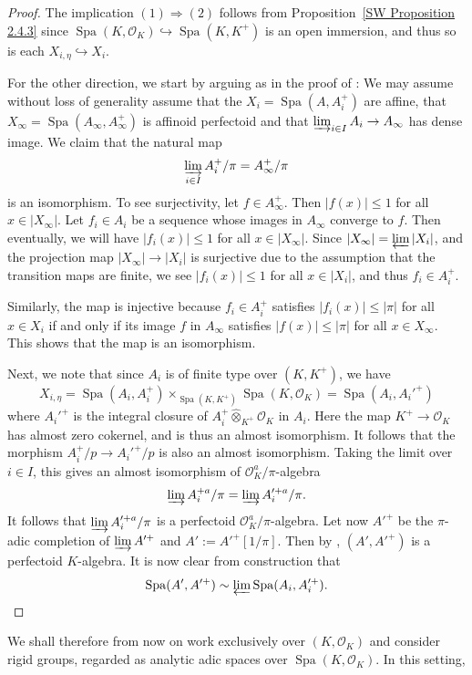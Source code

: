 \documentclass[10pt,oneside]{amsart}
\theoremstyle{definition}
\newcommand{\Spa}{\operatorname{Spa}}
\newcommand{\hotimes}{\hat{\otimes}}
\begin{document}
\begin{proof}
	The implication $(1)\Rightarrow (2)$ follows from Proposition~\ref{SW Proposition 2.4.3} since $\Spa(K,\mathcal O_K)\hookrightarrow \Spa(K,K^+)$ is an open immersion, and thus so is each $X_{i,\eta}\hookrightarrow X_i$.
	
	For the other direction, we start by arguing as in the proof of \cite[Prop. 2.4.5]{SW}: We may assume without loss of generality assume that the $X_i=\Spa(A,A_i^+)$ are affine, that $X_\infty=\Spa(A_\infty,A_\infty^+)$ is affinoid perfectoid and that $\varinjlim_{i\in I} A_i\to A_\infty$ has dense image. We claim that the natural map
	\[\varinjlim_{i\in I}A_i^+/\pi= A_\infty^{+}/\pi\]
	is an isomorphism. To see surjectivity, let $f\in A_\infty^+$. Then $|f(x)|\leq 1$ for all $x\in |X_\infty|$. Let $f_i\in A_i$ be a sequence whose images in $A_\infty$ converge to $f$. Then eventually, we will have $|f_i(x)|\leq 1$ for all  $x\in |X_\infty|$. Since $|X_\infty|=\varprojlim |X_i|$, and the projection map $|X_\infty|\to |X_i|$ is surjective due to the assumption that the transition maps are finite, we see $|f_i(x)|\leq 1$ for all $x\in |X_i|$, and thus $f_i\in A_i^+$.
	
	Similarly, the map is injective because $f_i\in A_i^+$ satisfies $|f_i(x)|\leq |\pi|$ for all $x\in X_i$ if and only if its image $f$ in $A_\infty$ satisfies $|f(x)|\leq |\pi|$ for all $x\in X_\infty$. This shows that the map is an isomorphism.
	
	
	Next, we note that since $A_i$ is of finite type over $(K,K^+)$, we have \[X_{i,\eta}=\Spa(A_i,A_i^+)\times_{\Spa(K,K^+)}\Spa(K,\mathcal O_K)=\Spa(A_i,A_i'^+)\]
	where $A_i'^+$ is the integral closure of $A_i^+\hotimes_{K^+}\mathcal O_K$ in $A_i$. Here the map $K^+\to \mathcal O_K$ has almost zero cokernel, and is thus an almost isomorphism. It follows that the morphism $A_i^+/p\to A_i'^+/p$ is also an almost isomorphism. Taking the limit over $i\in I$, this gives an almost isomorphism of $\mathcal O_K^a/\pi$-algebra
	\[\varinjlim A_i^{+a}/\pi=\varinjlim A'^{+a}_i/\pi.\]
	It follows that $\varinjlim A'^{+a}_i/\pi$ is a perfectoid $\mathcal O_K^a/\pi$-algebra. Let now $A'^{+}$ be the $\pi$-adic completion of $\varinjlim A'^+$ and $A':=A'^{+}[1/\pi]$. Then by \cite[Thm. 5.2]{perfectoid}, $(A',A'^+)$ is a perfectoid $K$-algebra. It is now clear from construction that 
	\[\Spa(A',A'^+)\sim \varprojlim\Spa(A_i,A_i'^+).\qedhere\]
\end{proof}
	We shall therefore from now on work exclusively over $(K,\mathcal O_K)$ and consider rigid groups, regarded as analytic adic spaces over $\Spa(K,\mathcal O_K)$. In this setting,
\end{document}
